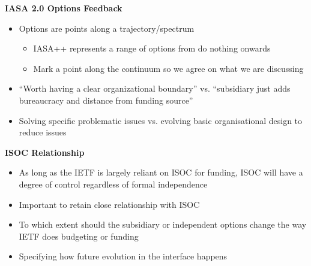\documentclass[helvetica,a4paper,landscape]{seminar}
\newcommand{\heading}[1]{%
  \begin{center} 
    \large\bf 
    #1 
  \end{center} 
  \vspace{.4 in}}
\begin{document}
\begin{slide}

\heading{IASA 2.0 Options Feedback}
{\footnotesize
\begin{itemize}
\item Options are points along a trajectory/spectrum
\begin{itemize}
\item IASA++ represents a range of options from do nothing onwards
\item Mark a point along the continuum so we agree on what we are discussing
\end{itemize}
\item ``Worth having a clear organizational boundary'' vs. ``subsidiary just adds bureaucracy and distance from funding source''
\item Solving specific problematic issues vs. evolving basic organisational design to reduce issues
\end{itemize}
}
\end{slide}

\begin{slide}

\heading{ISOC Relationship}
\begin{itemize}
\item As long as the IETF is largely reliant on ISOC for funding, ISOC will have a degree of control regardless of formal independence
\item Important to retain close relationship with ISOC
\item To which extent should the subsidiary or independent options change the way IETF does budgeting or funding
\item Specifying how future evolution in the interface happens
\end{itemize}
\end{slide}
\end{document}
